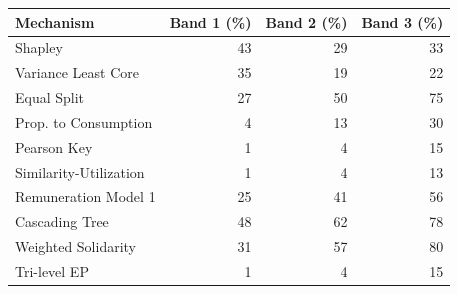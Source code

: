 \begin{tabular}{lrrr}
\toprule
Mechanism & Band 1 (\%) & Band 2 (\%) & Band 3 (\%) \\
\midrule
Shapley & 43 & 29 & 33 \\
Variance Least Core & 35 & 19 & 22 \\
Equal Split & 27 & 50 & 75 \\
Prop. to Consumption & 4 & 13 & 30 \\
Pearson Key & 1 & 4 & 15 \\
Similarity-Utilization & 1 & 4 & 13 \\
Remuneration Model 1 & 25 & 41 & 56 \\
Cascading Tree & 48 & 62 & 78 \\
Weighted Solidarity & 31 & 57 & 80 \\
Tri-level EP & 1 & 4 & 15 \\
\bottomrule
\end{tabular}
